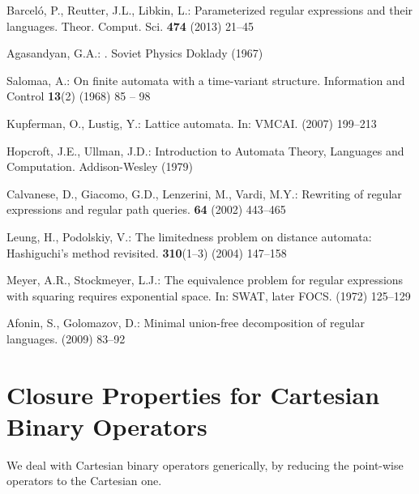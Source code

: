 \documentclass[envcountsame]{llncs}
\begin{document}
\begin{thebibliography}{10}
Barcel{\'o}, P., Reutter, J.L., Libkin, L.:
\newblock Parameterized regular expressions and their languages.
\newblock Theor. Comput. Sci. \textbf{474} (2013)  21--45

{Agasandyan}, G.A.:
.
\newblock Soviet Physics Doklady (1967)

Salomaa, A.:
\newblock On finite automata with a time-variant structure.
\newblock Information and Control \textbf{13}(2) (1968)  85 -- 98

Kupferman, O., Lustig, Y.:
\newblock Lattice automata.
\newblock In: {VMCAI}.
\newblock (2007)  199--213

Hopcroft, J.E., Ullman, J.D.:
\newblock Introduction to Automata Theory, Languages and Computation.
\newblock Addison-Wesley (1979)

Calvanese, D., Giacomo, G.D., Lenzerini, M., Vardi, M.Y.:
\newblock Rewriting of regular expressions and regular path queries.
 \textbf{64} (2002)  443--465

Leung, H., Podolskiy, V.:
\newblock The limitedness problem on distance automata: Hashiguchi's method
  revisited.
 \textbf{310}(1--3) (2004)  147--158

Meyer, A.R., Stockmeyer, L.J.:
\newblock The equivalence problem for regular expressions with squaring
  requires exponential space.
\newblock In: {SWAT, later FOCS}. (1972)  125--129

Afonin, S., Golomazov, D.:
\newblock Minimal union-free decomposition of regular languages.
\newblock (2009)  83--92

\end{thebibliography}


\appendix
\section{Closure Properties for Cartesian Binary Operators}
\label{sec:proofs:cart-binary-oper}

We deal with Cartesian binary operators generically, by reducing the
point-wise operators to the Cartesian one. 
\end{document}
